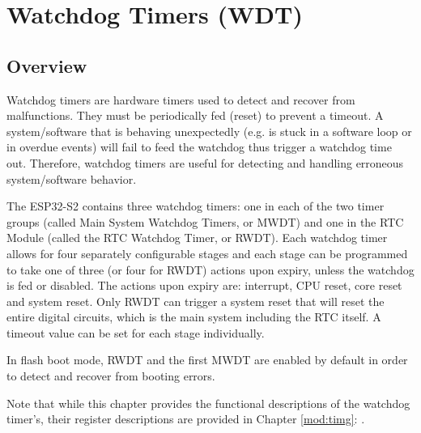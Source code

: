 \documentclass[main\_\_EN.tex]{subfiles}
\begin{document}
\setenglishformatting

\ifglobal
\else
    \listoftodos
    {\let\clearpage\relax \listofdonetodos}
    \tableofcontents
\fi




\hypertarget{wdt}{}
\chapter{Watchdog Timers (WDT)} 
\label{mod:wdt}


\section{Overview}

Watchdog timers are hardware timers used to detect and recover from malfunctions. They must be periodically fed (reset) to prevent a timeout. A system/software that is behaving unexpectedly (e.g. is stuck in a software loop or in overdue events) will fail to feed the watchdog thus trigger a watchdog time out. Therefore, watchdog timers are useful for detecting and handling erroneous system/software behavior.

The ESP32-S2 contains three watchdog timers: one in each of the two timer groups (called Main System Watchdog Timers, or MWDT) and one in the RTC Module (called the RTC Watchdog Timer, or RWDT).  Each watchdog timer allows for four separately configurable stages and each stage can be programmed to take one of three (or four for RWDT) actions upon expiry, unless the watchdog is fed or disabled. The actions upon expiry are: interrupt, CPU reset, core reset and system reset. Only RWDT can trigger  a system reset that will reset the entire digital circuits, which is the main system including the RTC itself. A timeout value can be set for each stage individually.

In flash boot mode, RWDT and the first MWDT are enabled by default in order to detect and recover from booting errors.

Note that while this chapter provides the functional descriptions of the watchdog timer’s, their register descriptions are provided in Chapter \ref{mod:timg}: \textit{}.
\end{document}

